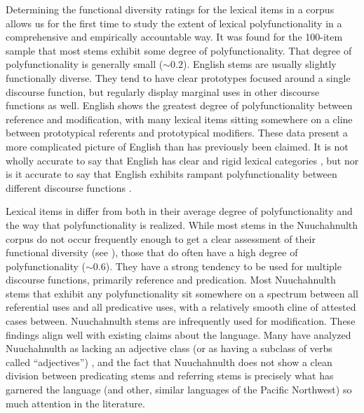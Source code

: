 Determining the functional diversity ratings for the lexical items in a corpus allows us for the first time to study the extent of lexical polyfunctionality in a comprehensive and empirically accountable way. It was found for the 100-item  sample that most stems exhibit some degree of polyfunctionality. That degree of polyfunctionality is generally small ($\sim0.2$). English stems are usually slightly functionally diverse. They tend to have clear prototypes focused around a single discourse function, but regularly display marginal uses in other discourse functions as well. English shows the greatest degree of polyfunctionality between reference and modification, with many lexical items sitting somewhere on a cline between prototypical referents and prototypical modifiers. These data present a more complicated picture of English than has previously been claimed. It is not wholly accurate to say that English has clear and rigid lexical categories \parencites[710]{Rijkhoff2007}[4, 11, 12]{SchachterShopen2007}[122, 126]{Velupillai2012}, but nor is it accurate to say that English exhibits rampant polyfunctionality between different discourse functions \parencites[47--48]{Crystal1967}{Vonen1994}[75--76]{Croft2000}[69]{Croft2001b}{Farrell2001}{Cannon1985}.

Lexical items in  differ from  both in their average degree of polyfunctionality and the way that polyfunctionality is realized. While most stems in the Nuuchahnulth corpus do not occur frequently enough to get a clear assessment of their functional diversity (see ), those that do often have a high degree of polyfunctionality ($\sim0.6$). They have a strong tendency to be used for multiple discourse functions, primarily reference and predication. Most Nuuchahnulth stems that exhibit any polyfunctionality sit somewhere on a spectrum between all referential uses and all predicative uses, with a relatively smooth cline of attested cases between. Nuuchahnulth stems are infrequently used for modification. These findings align well with existing claims about the language. Many have analyzed Nuuchahnulth as lacking an adjective class (or as having a subclass of verbs called \enquote{adjectives}) \parencites{Swadesh1939b}{Jacobsen1979}{Nakayama2001}, and the fact that Nuuchahnulth does not show a clean division between predicating stems and referring stems is precisely what has garnered the language (and other, similar languages of the Pacific Northwest) so much attention in the literature.


